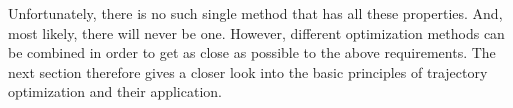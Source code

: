 Unfortunately, there is no such single method that has all these properties. And, most likely, there will never be one. However, different optimization methods can be combined in order to get as close as possible to the above requirements. The next section therefore gives a closer look into the basic principles of trajectory optimization and their application.

